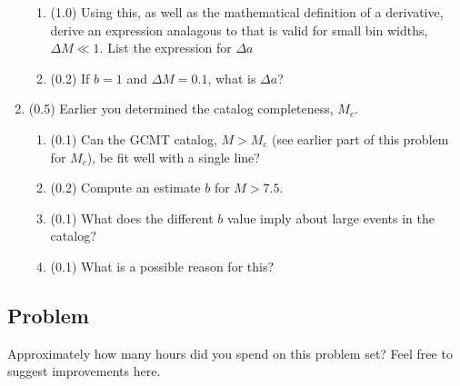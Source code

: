 \documentclass[11pt,titlepage,fleqn]{article}
\begin{document}
\begin{enumerate}
\begin{enumerate}
\item (1.0) Using this, as well as the mathematical definition of a derivative, derive an expression analagous to  that is valid for small bin widths, $\Delta M \ll 1$. List the expression for $\Delta a$

\item (0.2) If $b = 1$ and $\Delta M = 0.1$, what is $\Delta a$?

\end{enumerate}


\item (0.5) Earlier you determined the catalog completeness, $M_c$.
%
\begin{enumerate}
\item (0.1) Can the GCMT catalog, $M > M_c$ (see earlier part of this problem for $M_c$), be fit well with a single line?
\item (0.2) Compute an estimate $b$ for $M > 7.5$.
\item (0.1) What does the different $b$ value imply about large events in the catalog?
\item (0.1) What is a possible reason for this?
\end{enumerate}

\end{enumerate}


\subsection*{Problem}

Approximately how many hours did you spend on this problem set? Feel free to suggest improvements here.




\end{document}
